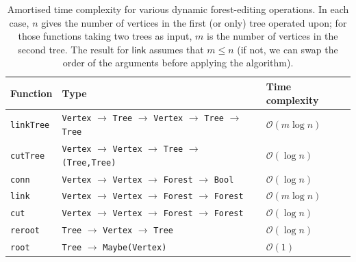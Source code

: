 \documentclass{elsarticle}
\newcommand{\MATHSF}[1]{\ensuremath{\mathsf{#1}}\xspace}
\newcommand{\link}{\MATHSF{link}}
\renewcommand{\O}{\ensuremath{\mathcal{O}}}
\begin{document}
\begin{center}
\begin{small}
\begin{table}
\caption{Amortised time complexity for various dynamic forest-editing operations. In each case, $n$ gives the number of vertices in the first (or only) tree operated upon; for those functions taking two trees as input, $m$ is the number of vertices in the second tree. The result for \link assumes that $m \leq n$ (if not, we can swap the order of the arguments before applying the algorithm).}
 \begin{tabular}{|| l | l | l ||} 
 \hline
 Function & Type & Time complexity \\ %
 \hline\hline
 \texttt{linkTree} & \texttt{Vertex} $\to$ \texttt{Tree} $\to$ \texttt{Vertex} $\to$ \texttt{Tree} $\to$ \texttt{Tree} & $\O(m\log n)$ \\
 \texttt{cutTree} & \texttt{Vertex} $\to$ \texttt{Vertex} $\to$ \texttt{Tree} $\to$ \texttt{(Tree,Tree)} & $\O(\log n)$ \\
 \hline
 \texttt{conn} & \texttt{Vertex} $\to$ \texttt{Vertex} $\to$ \texttt{Forest} $\to$ \texttt{Bool} & $\O(\log n)$ \\ 
 \texttt{link} & \texttt{Vertex} $\to$ \texttt{Vertex} $\to$ \texttt{Forest} $\to$ \texttt{Forest} & $\O(m\log n)$ \\
 \texttt{cut} & \texttt{Vertex} $\to$ \texttt{Vertex} $\to$ \texttt{Forest} $\to$ \texttt{Forest} & $\O(\log n)$ \\
 \hline
 \texttt{reroot} & \texttt{Tree} $\to$ \texttt{Vertex} $\to$ \texttt{Tree} & $\O(\log n)$ \\
 \texttt{root} & \texttt{Tree} $\to$ \texttt{Maybe(Vertex)} & $\O(1)$ \\
 \hline   
\end{tabular}
\label{tab:our-complexities}
\end{table}
\end{small} 
\end{center}
\end{document}
